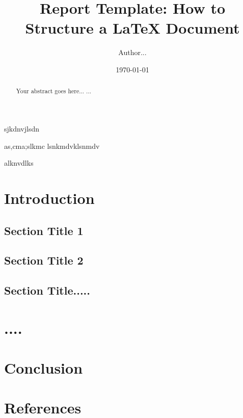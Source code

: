 \documentclass[11pt,a4paper]{report}
\begin{document}
\title{Report Template: How to Structure a LaTeX Document}
\author{Author...}
\date{\today}
\maketitle

\begin{abstract}
Your abstract goes here...
...
\end{abstract}
sjkdnvjlsdn

as,cma;slkmc
lsnkmdvklsnmdv

alknvdlks
\chapter{Introduction}
\section{Section Title 1}
\section{Section Title 2}
\section{Section Title.....}

\chapter{....}

\chapter{Conclusion}


\chapter*{References}
\end{document}
